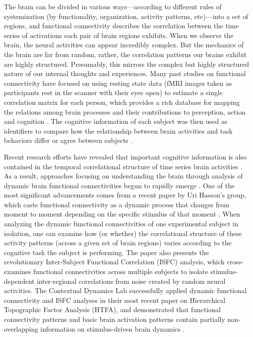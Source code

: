 \documentclass[11pt]{article}
\begin{document}
The brain can be divided in various ways---according to different rules of systemization (by functionality, organization, activity patterns, etc)---into a set of regions, and functional connectivity describes the correlation between the time series of activations each pair of brain regions exhibits. When we observe the brain, the neural activities can appear incredibly complex. But the mechanics of the brain are far from random, rather, the correlation patterns our brains exhibit are highly structured. Presumably, this mirrors the complex but highly structured nature of our internal thoughts and experiences. Many past studies on functional connectivity have focused on using resting state data (fMRI images taken as participants rest in the scanner with their eyes open) to estimate a single correlation matrix for each person, which provides a rich database for mapping the relations among brain processes and their contributions to perception, action and cognition \citep{peterson9,Bassett2017}. The cognitive information of each subject was then used as identifiers to compare how the relationship between brain activities and task behaviors differ or agree between subjects \citep{Turke13,Rubinov2010,peterson10}.

Recent research efforts have revealed that important cognitive information is also contained in the temporal correlational structure of time series brain activities \citep{davidson2016}. As a result, approaches focusing on understanding the brain through analysis of dynamic brain functional connectivities begun to rapidly emerge \citep{Nigam2016,Hutchinson2013}. One of the most significant advancements comes from a recent paper by Uri Hasson's group, which casts functional connectivity as a dynamic process that changes from moment to moment depending on the specific stimulus of that moment \citep{hasson2016}. When analyzing the dynamic functional connectivities of one experimental subject in isolation, one can examine how (or whether) the correlational structure of these activity patterns (across a given set of brain regions) varies according to the cognitive task the subject is performing. The paper also presents the revolutionary Inter-Subject Functional Correlation (ISFC) analysis, which cross-examines functional connectivities across multiple subjects to isolate stimulus-dependent inter-regional correlations from noise created by random neural activities. The Contextual Dynamics Lab successfully applied dynamic functional connectivity and ISFC analyses in their most recent paper on Hierarchical Topographic Factor Analysis (HTFA), and demonstrated that functional connectivity patterns and basic brain activation patterns contain partially non-overlapping information on stimulus-driven brain dynamics \citep{jeremy2017}.
\end{document}
